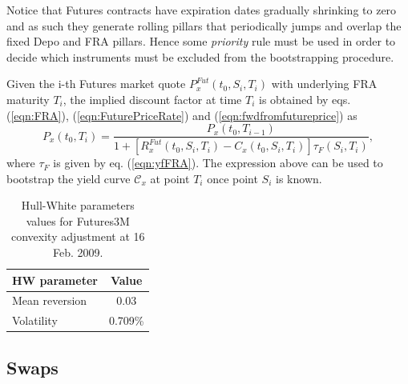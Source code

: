 \documentclass[11pt,reqno]{amsart}
\begin{document}
Notice that Futures contracts have expiration dates gradually shrinking to zero and as such they generate rolling pillars that periodically jumps and overlap the fixed Depo and FRA pillars. Hence some \emph{priority} rule must be used in order to decide which instruments must be excluded from the bootstrapping procedure.
\par
Given the i-th Futures market quote $P^{Fut}_x\left(t_0,S_i,T_i\right)$ with underlying FRA maturity $T_i$, the implied discount factor at time $T_i$ is obtained by eqs. (\ref{eqn:FRA}), (\ref{eqn:FuturePriceRate}) and (\ref{eqn:fwdfromfutureprice}) as
\begin{equation}
P_x\left(t_0,T_i\right)
=   \frac{P_x\left(t_0,T_{i-1}\right)}
         {1+\left[R^{Fut}_x\left(t_0,S_i,T_i\right) -
          C_x\left(t_0,S_i,T_i\right)\right]
          \tau_F\left(S_i,T_i\right)},
\label{eqn:FuturesBootstrap}
\end{equation}
where $\tau_F$ is given by eq. (\ref{eqn:yfFRA}). The expression above can be used to bootstrap the yield curve $\mathcal{C}_x$ at point $T_i$ once point $S_i$ is known.

\begin{table}[tbp]
\begin{tabular}{lc}
\midrule
HW parameter   & Value \\
\midrule
Mean reversion & 0.03  \\
Volatility & 0.709\%   \\
\midrule
\end{tabular}
\caption{Hull-White parameters values for Futures3M convexity adjustment at 16 Feb. 2009.}
\label{tab:FuturesConAdy}
\end{table}


\subsection{Swaps}
\label{sec:Swap}
\end{document}
